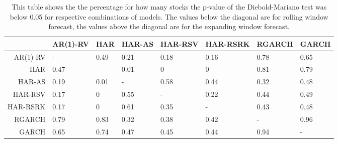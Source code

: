 \begin{table}[ht]
\centering
\begin{tabular}{rlllllll}
  \hline
 & AR(1)-RV & HAR & HAR-AS & HAR-RSV & HAR-RSRK & RGARCH & GARCH \\ 
  \hline
AR(1)-RV & - & 0.49 & 0.21 & 0.18 & 0.16 & 0.78 & 0.65 \\ 
  HAR & 0.47 & - & 0.01 & 0 & 0 & 0.81 & 0.79 \\ 
  HAR-AS & 0.19 & 0.01 & - & 0.58 & 0.44 & 0.32 & 0.48 \\ 
  HAR-RSV & 0.17 & 0 & 0.55 & - & 0.22 & 0.44 & 0.49 \\ 
  HAR-RSRK & 0.17 & 0 & 0.61 & 0.35 & - & 0.43 & 0.48 \\ 
  RGARCH & 0.79 & 0.83 & 0.32 & 0.38 & 0.42 & - & 0.96 \\ 
  GARCH & 0.65 & 0.74 & 0.47 & 0.45 & 0.44 & 0.94 & - \\ 
   \hline
\end{tabular}
\caption[DM test below 0.05]{This table shows the the percentage for how many stocks the p-value of the Diebold-Mariano test was below 0.05 for respective combinations of models.
                The values below the diagonal are for rolling window forecast, the values above the diagonal are for the expanding window forecast.} 
\label{Table:DM_test_threshold}
\end{table}
